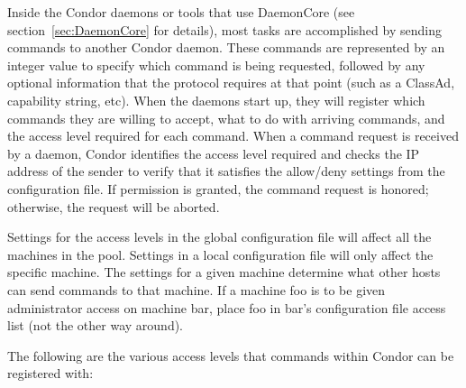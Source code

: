 Inside the Condor daemons or tools that use DaemonCore (see
section~\ref{sec:DaemonCore} for details), most
tasks are accomplished by sending commands to another Condor daemon.
These commands are represented by an integer value to specify which command
is being requested, followed
by any optional information that the protocol requires at that point
(such as a ClassAd, capability string, etc).
When the daemons start up,
they will register which commands they are willing to accept, what to
do with arriving commands, and the access level required for
each command.
When a command request is received by a daemon, Condor identifies the  access level
required and checks the IP address of the sender to verify that
it satisfies the allow/deny settings
from the configuration file.
If permission is granted, the command request is honored;
otherwise, the request will be aborted.

Settings for the access levels in the global
configuration file will affect all the machines in the pool.
Settings in a local configuration file will only affect the specific machine.
The settings for a given machine determine what other hosts can send
commands to that machine.
If a machine foo is to be given
administrator access on machine bar, place foo in
bar's configuration file access list (not the other way around).


The following are the various access levels that commands within
Condor can be registered with:

